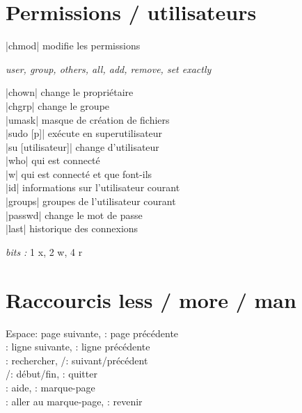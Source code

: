 \documentclass[9pt]{extarticle}
\newcommand{\lstcode}[1]{\inlinecode{\detokenize{#1}}}
\let\oldkeys\keys
\renewcommand{\keys}[1]{\small\oldkeys{#1}\normalsize}
\newenvironment{cmdblock}{%
  \par\setlength{\parindent}{0pt}\setlength{\parskip}{0pt}%
  \RaggedRight%
}{\par}
\newlength{\cmdoptindent}
\newcommand{\cmdopt}[1]{%
  \hspace*{\cmdoptindent}%
  \begin{minipage}[t]{\dimexpr\linewidth-\cmdoptindent\relax}
    \RaggedRight \itshape #1%
  \end{minipage}\par
}
\begin{document}
\begin{multicols}{4}
\section*{Permissions / utilisateurs}

\begin{cmdblock}
\code|chmod| \quad modifie les permissions \\
\cmdopt{\lstcode{u} user, \lstcode{g} group, \lstcode{o} others, \lstcode{a} all,
        \lstcode{+} add, \lstcode{-} remove, \lstcode{=} set exactly}
\code|chown| \quad change le propriétaire \\
\code|chgrp| \quad change le groupe \\
\code|umask| \quad masque de création de fichiers \\
\code|sudo [p]| \quad exécute en superutilisateur \\
\code|su [utilisateur]| \quad change d'utilisateur \\
\code|who| \quad qui est connecté \\
\code|w| \quad qui est connecté et que font-ils \\
\code|id| \quad informations sur l'utilisateur courant \\
\code|groups| \quad groupes de l'utilisateur courant \\
\code|passwd| \quad change le mot de passe \\
\code|last| \quad historique des connexions \\
\end{cmdblock}

\textit{bits :} 1 x, 2 w, 4 r

\section*{Raccourcis less / more / man}
\begin{cmdblock}
Espace: page suivante, : page précédente \\
\keys{\return}{}: ligne suivante, : ligne précédente \\
\keys{/}: rechercher, /: suivant/précédent \\
/: début/fin, : quitter \\
: aide, : marque-page \\
: aller au marque-page, : revenir \\
\end{cmdblock}



\end{multicols}
\end{document}
